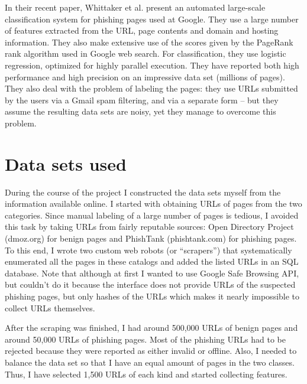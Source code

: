 \documentclass{article}
\begin{document}

In their recent paper, Whittaker et al. \cite{WhittakerRyner10}
present an automated large-scale classification system for phishing
pages used at Google. They use a large number of features extracted
from the URL, page contents and domain and hosting information. They
also make extensive use of the scores given by the PageRank rank
algorithm used in Google web search. For classification, they use
logistic regression, optimized for highly parallel execution. They
have reported both high performance and high precision on an
impressive data set (millions of pages). They also deal with the
problem of labeling the pages: they use URLs submitted by the users
via a Gmail spam filtering, and via a separate form -- but they assume
the resulting data sets are noisy, yet they manage to overcome this
problem.

\section{Data sets used}
\label{sec:data-sets}

During the course of the project I constructed the data sets myself
from the information available online. I started with obtaining URLs
of pages from the two categories. Since manual labeling of a large
number of pages is tedious, I avoided this task by taking URLs from
fairly reputable sources: Open Directory Project (dmoz.org) for benign
pages and PhishTank (phishtank.com) for phishing pages. To this end, I
wrote two custom web robots (or ``scrapers'') that systematically
enumerated all the pages in these catalogs and added the listed URLs
in an SQL database.  Note that although at first I wanted to use
Google Safe Browsing API, but couldn't do it because the interface
does not provide URLs of the suspected phishing pages, but only hashes
of the URLs which makes it nearly impossible to collect URLs
themselves.

After the scraping was finished, I had around 500,000 URLs of benign
pages and around 50,000 URLs of phishing pages. Most of the phishing
URLs had to be rejected because they were reported as either invalid
or offline. Also, I needed to balance the data set so that I have an
equal amount of pages in the two classes. Thus, I have selected 1,500
URLs of each kind and started collecting features.
\end{document}
